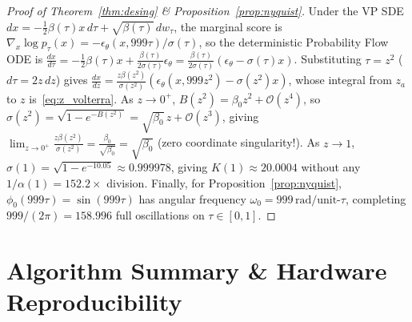 \documentclass[11pt,a4paper]{article}
\theoremstyle{definition}
\theoremstyle{remark}
\begin{document}
\begin{proof}[Proof of Theorem~\ref{thm:desing} \& Proposition~\ref{prop:nyquist}]
Under the VP SDE $dx = -\frac{1}{2}\beta(\tau) x\,d\tau + \sqrt{\beta(\tau)}\,dw_\tau$, the marginal score is $\nabla_x \log p_\tau(x) = -\epsilon_\theta(x, 999\tau)/\sigma(\tau)$, so the deterministic Probability Flow ODE is $\frac{dx}{d\tau} = -\frac{1}{2}\beta(\tau)x + \frac{\beta(\tau)}{2\sigma(\tau)}\epsilon_\theta = \frac{\beta(\tau)}{2\sigma(\tau)}(\epsilon_\theta - \sigma(\tau)x)$. Substituting $\tau = z^2$ ($d\tau = 2z\,dz$) gives $\frac{dx}{dz} = \frac{z\beta(z^2)}{\sigma(z^2)}(\epsilon_\theta(x, 999 z^2) - \sigma(z^2)x)$, whose integral from $z_a$ to $z$ is~\eqref{eq:z_volterra}. As $z \to 0^+$, $B(z^2) = \beta_0 z^2 + \mathcal{O}(z^4)$, so $\sigma(z^2) = \sqrt{1 - e^{-B(z^2)}} = \sqrt{\beta_0}\,z + \mathcal{O}(z^3)$, giving $\lim_{z\to 0^+} \frac{z\beta(z^2)}{\sigma(z^2)} = \frac{\beta_0}{\sqrt{\beta_0}} = \sqrt{\beta_0}$ (zero coordinate singularity!). As $z \to 1$, $\sigma(1) = \sqrt{1 - e^{-10.05}} \approx 0.999978$, giving $K(1) \approx 20.0004$ without any $1/\alpha(1) = 152.2\times$ division. Finally, for Proposition~\ref{prop:nyquist}, $\phi_0(999\tau) = \sin(999\tau)$ has angular frequency $\omega_0 = 999\,\mathrm{rad}/\text{unit-}\tau$, completing $999/(2\pi) = 158.996$ full oscillations on $\tau \in [0, 1]$.
\end{proof}

\section{Algorithm Summary \& Hardware Reproducibility}
\label{app:algo}
\end{document}
